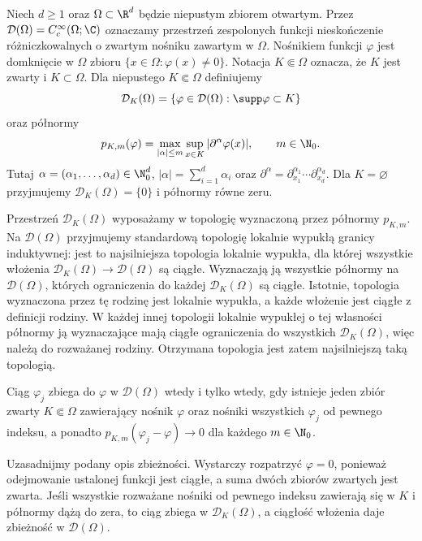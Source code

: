 \begin{definicja}
\label{def:pde7-test}
Niech $d\ge1$ oraz $\Omega\subset\R^d$ będzie niepustym zbiorem otwartym.
Przez $\mathcal D(\Omega)=C_c^\infty(\Omega;\C)$ oznaczamy przestrzeń
zespolonych funkcji nieskończenie różniczkowalnych o zwartym nośniku
zawartym w $\Omega$. Nośnikiem funkcji $\varphi$ jest domknięcie
w $\Omega$ zbioru $\{x\in\Omega:\varphi(x)\ne0\}$.
Notacja $K\Subset\Omega$ oznacza, że $K$ jest zwarty i $K\subset\Omega$.
Dla niepustego $K\Subset\Omega$ definiujemy
\[
 \mathcal D_K(\Omega)=
 \{\varphi\in\mathcal D(\Omega):\supp\varphi\subset K\}
\]
oraz półnormy
\[
 p_{K,m}(\varphi)=\max_{|\alpha|\le m}
 \sup_{x\in K}|\partial^\alpha\varphi(x)|,\qquad m\in\N_0.
\]
Tutaj $\alpha=(\alpha_1,\ldots,\alpha_d)\in\N_0^d$,
$|\alpha|=\sum_{i=1}^d\alpha_i$ oraz
$\partial^\alpha=\partial_{x_1}^{\alpha_1}\cdots
\partial_{x_d}^{\alpha_d}$.
Dla $K=\varnothing$ przyjmujemy $\mathcal D_K(\Omega)=\{0\}$
i półnormy równe zeru.

Przestrzeń $\mathcal D_K(\Omega)$ wyposażamy w topologię
wyznaczoną przez półnormy $p_{K,m}$. Na $\mathcal D(\Omega)$
przyjmujemy standardową topologię lokalnie wypukłą granicy
induktywnej: jest to najsilniejsza topologia lokalnie wypukła,
dla której wszystkie włożenia $\mathcal D_K(\Omega)\to
\mathcal D(\Omega)$ są ciągłe. Wyznaczają ją wszystkie półnormy
na $\mathcal D(\Omega)$, których ograniczenia do każdej
$\mathcal D_K(\Omega)$ są ciągłe. Istotnie, topologia
wyznaczona przez tę rodzinę jest lokalnie wypukła,
a każde włożenie jest ciągłe z definicji rodziny.
W każdej innej topologii lokalnie wypukłej o tej
własności półnormy ją wyznaczające mają ciągłe
ograniczenia do wszystkich $\mathcal D_K(\Omega)$,
więc należą do rozważanej rodziny. Otrzymana
topologia jest zatem najsilniejszą taką topologią.

Ciąg $\varphi_j$ zbiega do $\varphi$ w $\mathcal D(\Omega)$
wtedy i tylko wtedy, gdy istnieje jeden zbiór zwarty
$K\Subset\Omega$ zawierający nośnik $\varphi$ oraz nośniki
wszystkich $\varphi_j$ od pewnego indeksu, a ponadto
$p_{K,m}(\varphi_j-\varphi)\to0$ dla każdego $m\in\N_0$.
\end{definicja}

Uzasadnijmy podany opis zbieżności. Wystarczy rozpatrzyć
$\varphi=0$, ponieważ odejmowanie ustalonej funkcji jest
ciągłe, a suma dwóch zbiorów zwartych jest zwarta.
Jeśli wszystkie rozważane nośniki od pewnego indeksu
zawierają się w $K$ i półnormy dążą do zera, to ciąg
zbiega w $\mathcal D_K(\Omega)$, a ciągłość włożenia
daje zbieżność w $\mathcal D(\Omega)$.

